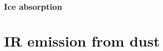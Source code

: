 \begin{frame}\frametitle{Ice absorption}


\begin{center}
\end{center}









%
%




\end{frame}

\section{IR emission from dust}

